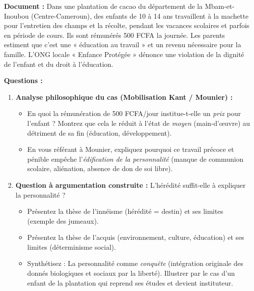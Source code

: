 \documentclass[11pt]{article}
\begin{document}
\begin{exercice}
\textbf{Document :} Dans une plantation de cacao du département de la Mbam-et-Inoubou (Centre-Cameroun), des enfants de 10 à 14 ans travaillent à la machette pour l'entretien des champs et la récolte, pendant les vacances scolaires et parfois en période de cours. Ils sont rémunérés 500 FCFA la journée. Les parents estiment que c'est une « éducation au travail » et un revenu nécessaire pour la famille. L'ONG locale « Enfance Protégée » dénonce une violation de la dignité de l'enfant et du droit à l'éducation.

\textbf{Questions :}
\begin{enumerate}
    \item \textbf{Analyse philosophique du cas (Mobilisation Kant / Mounier) :}
    \begin{itemize}
        \item[a)] En quoi la rémunération de 500 FCFA/jour institue-t-elle un \emph{prix} pour l'enfant ? Montrez que cela le réduit à l'état de \emph{moyen} (main-d'œuvre) au détriment de sa fin (éducation, développement).
        \item[b)] En vous référant à Mounier, expliquez pourquoi ce travail précoce et pénible empêche l'\emph{édification de la personnalité} (manque de communion scolaire, aliénation, absence de don de soi libre).
    \end{itemize}
    \item \textbf{Question à argumentation construite :} \og L'hérédité suffit-elle à expliquer la personnalité ? \fg
    \begin{itemize}
        \item[a)] Présentez la thèse de l'innéisme (hérédité = destin) et ses limites (exemple des jumeaux).
        \item[b)] Présentez la thèse de l'acquis (environnement, culture, éducation) et ses limites (déterminisme social).
        \item[c)] Synthétisez : La personnalité comme \emph{conquête} (intégration originale des donnés biologiques et sociaux par la liberté). Illustrer par le cas d'un enfant de la plantation qui reprend ses études et devient instituteur.
    \end{itemize}
\end{enumerate}
\end{exercice}

\newpage
\end{document}
